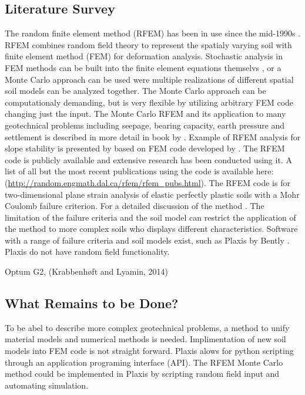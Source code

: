\subsection*{Literature Survey}
The random finite element method (RFEM) has been in use since the mid-1990s \citep*[e.g, see][]{griffiths1993seepage}. RFEM combines random field theory to represent the spatialy varying soil with finite element method (FEM) for deformation analysis. Stochastic analysis in FEM methods can be built into the finite element equations themselvs \citep*[e.g., see][]{vanmarcke1983stochastic}, 
or a Monte Carlo approach can be used were multiple realizations of different spatial soil models can be analyzed together. The Monte Carlo approach can be computationaly demanding, but is very flexible by utilizing arbitrary FEM code changing just the input. The Monte Carlo RFEM and its application to many geotechnical problems including seepage, bearing capacity, earth pressure and settlement is described in more detail in book by \citet*{fenton2008risk}.
Example of RFEM analysis for slope stability is presented by \citep*[see][Chapter 13]{fenton2008risk} based on FEM code developed by \citet*{smith2013programming}. The RFEM code is publicly available and extensive research has been conducted using it. A list of all but the most recent publications using the code is available here: (\url{http://random.engmath.dal.ca/rfem/rfem_pubs.html}). 
The RFEM code is for two-dimensional plane strain analysis of elastic perfectly plastic soils with a Mohr Coulomb failure criterion. For a detailed discussion of the method \citep*[e.g, see][]{griffiths1999slope}.
The limitation of the failure criteria and the soil model can restrict the application of the method to more complex soils who displays different characteristics. Software with a range of failure criteria and soil models exist, such as Plaxis by Bently \citep{brinkgreve2010plaxis}. Plaxis do not have random field functionality. 

Optum G2, (Krabbenhøft and Lyamin,  2014) 


\subsection*{What Remains to be Done?}
To be abel to describe more complex geotechnical problems, a method to unify material models and numerical methods is needed. Implimentation of new soil models into FEM code is not straight forward. 
Plaxis alows for python scripting through an application programing interface (API). 
The RFEM Monte Carlo method could be implemented in Plaxis by scripting random field input and automating simulation.


